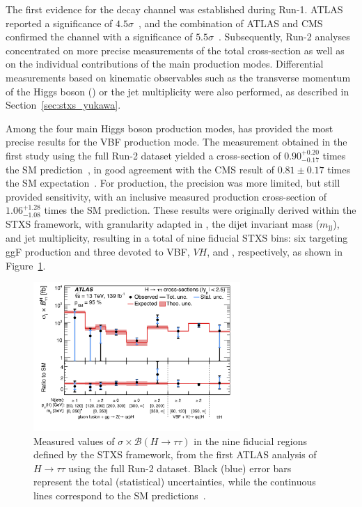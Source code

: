   The first evidence for the \htautau decay channel was established during Run-1. ATLAS reported a significance of $4.5\sigma$~\cite{htau_2015}, and the combination of ATLAS and CMS confirmed the channel with a significance of $5.5\sigma$~\cite{htau_cms_atlas_2016}. Subsequently, Run-2 analyses concentrated on more precise measurements of the total cross-section as well as on the individual contributions of the main production modes. Differential measurements based on kinematic observables such as the transverse momentum of the Higgs boson (\pth) or the jet multiplicity were also performed, as described in Section~\ref{sec:stxs_yukawa}.  
  
  Among the four main Higgs boson production modes, \htautau has provided the most precise results for the VBF production mode. The measurement obtained in the first study using the full Run-2 dataset yielded a cross-section of $0.90^{+0.20}_{-0.17}$ times the SM prediction~\cite{2022}, in good agreement with the CMS result of $0.81 \pm 0.17$ times the SM expectation~\cite{Tumasyan_2023}. For \ttH production, the precision was more limited, but still provided sensitivity, with an inclusive measured production cross-section of $1.06^{+1.28}_{-1.08}$ times the SM prediction. These results were originally derived within the STXS framework, with granularity adapted in \pth, the dijet invariant mass ($m_{\text{jj}}$), and jet multiplicity, resulting in a total of nine fiducial STXS bins: six targeting ggF production and three devoted to VBF, $VH$, and \ttH, respectively, as shown in Figure~\ref{fig:atlas_htautau_stxs}.
  
\begin{figure}[htbp]
    \centering
    \includegraphics[width=0.7\textwidth]{images/pois_9pois.png}
    \caption{Measured values of $\sigma \times \mathcal{B}(H \to \tau\tau)$ in the nine fiducial regions defined by the STXS framework, from the first ATLAS analysis of $H \to \tau\tau$ using the full Run-2 dataset. Black (blue) error bars represent the total (statistical) uncertainties, while the continuous lines correspond to the SM predictions~\cite{2022}.}
    \label{fig:atlas_htautau_stxs}
\end{figure}

